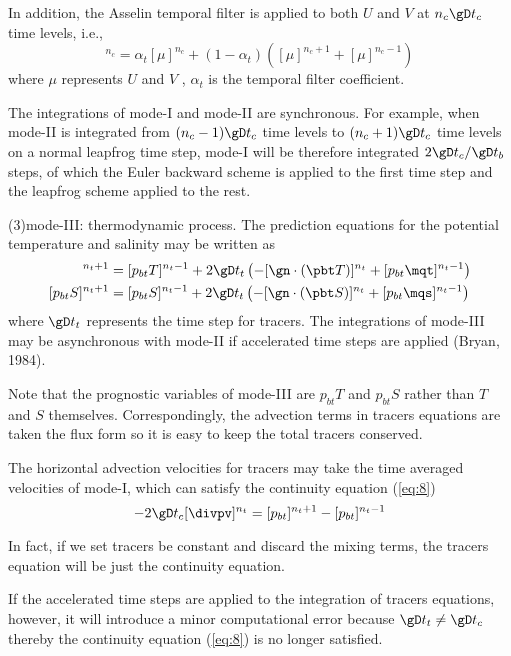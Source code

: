  In addition, the Asselin temporal filter is applied to both $U$
and $V$ at $n_{c}\gD t_{c}$ time levels, i.e., 
\begin{equation}
[\mu]^{n_{c}}=\alpha_{t}[\mu]^{n_{c}}+(1-\alpha_{t})\left([\mu]^{n_{c}+1}+[\mu]^{n_{c}-1}\right)
\end{equation}
 where $\mu$ represents $U$ and $V$ , $\alpha_{t}$ is the temporal
filter coefficient.

The integrations of mode-\mbox{I} and mode-\mbox{II} are synchronous.
For example, when mode-\mbox{II} is integrated from $(n_{c}-1)\gD t_{c}$
time levels to $(n_{c}+1)\gD t_{c}$ time levels on a normal
leapfrog time step, mode-\mbox{I} will be therefore integrated $2\gD t_{c}/\gD t_{b}$
steps, of which the Euler backward scheme is applied to the first
time step and the leapfrog scheme applied to the rest.

(3)mode-\mbox{III}: thermodynamic process. The prediction equations
for the potential temperature and salinity may be written as
\bese
\begin{align}
  [p_{bt}T]^{n_{t}+1}&=[p_{bt}T]^{n_{t}-1}+2\gD
  t_{t}\left(-[\gn\cdot(\pbt T)]^{n_{t}}+[p_{bt}\mqt]^{n_{t}-1}\right)\\
  [p_{bt}S]^{n_{t}+1}&=[p_{bt}S]^{n_{t}-1}+2\gD
  t_{t}\left(-[\gn\cdot(\pbt S)]^{n_{t}}+[p_{bt}\mqs]^{n_{t}-1}\right)
\end{align}
\ense
 where $\gD t_{t}$ represents the time step for tracers. The
integrations of mode-\mbox{III} may be asynchronous with mode-\mbox{II}
if accelerated time steps are applied (Bryan, 1984).

Note that the prognostic variables of mode-\mbox{III} are $p_{bt}T$
and $p_{bt}S$ rather than $T$ and $S$ themselves. Correspondingly,
the advection terms in tracers equations are taken the flux form so
it is easy to keep the total tracers conserved.

The horizontal advection velocities for tracers may take the time
averaged velocities of mode-\mbox{I}, which can satisfy the continuity
equation (\ref{eq:8})
\begin{equation}
-2\gD t_{c}[\divpv]^{n_{t}}=[p_{bt}]^{n_{t}+1}-[p_{bt}]^{n_{t}-1}
\end{equation}

 In fact, if we set tracers be constant and discard the mixing terms,
the tracers equation will be just the continuity equation.

If the accelerated time steps are applied to the integration of tracers
equations, however, it will introduce a minor computational error
because $\gD t_{t}\neq\gD t_{c}$ thereby the continuity
equation (\ref{eq:8}) is no longer satisfied.

